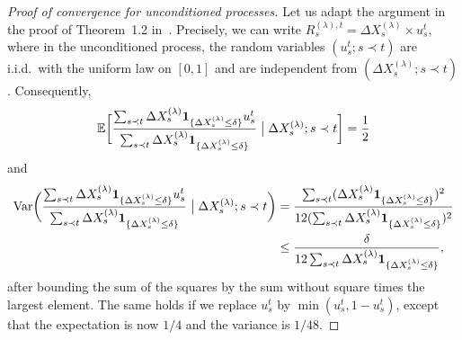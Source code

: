 \documentclass[british, a4paper,11pt]{article}
\numberwithin{equation}{section}
\theoremstyle{definition}
\newcommand{\E}{\mathop{}\!\mathbb{E}}
\newcommand{\Var}{\mathrm{Var}}
\newcommand{\ind}[1]{\mathbf{1}_{\{#1\}}}
\begin{document}
\begin{proof}[Proof of convergence for unconditioned processes]
Let us adapt the argument in the proof of Theorem~1.2 in~\cite{CK14}.
Precisely, we can write $R^{(\lambda),t}_s = \Delta X^{(\lambda)}_s \times u^t_s$, where 
in the unconditioned process, the random variables $(u^t_s ; s \prec t)$ are i.i.d.~with the uniform law on $[0,1]$ and are independent from $(\Delta X^{(\lambda)}_s ; s \prec t)$. Consequently,
\[\E\biggl[\frac{\sum_{s \prec t} \Delta X^{(\lambda)}_s \ind{\Delta X^{(\lambda)}_s \leq \delta} u^t_s}{\sum_{s \prec t} \Delta X^{(\lambda)}_s \ind{\Delta X^{(\lambda)}_s \leq \delta}} \bigm| \Delta X^{(\lambda)}_s ; s \prec t \biggr] = \frac{1}{2}\]
and
\begin{align*}
\Var\biggl(\frac{\sum_{s \prec t} \Delta X^{(\lambda)}_s \ind{\Delta X^{(\lambda)}_s \leq \delta} u^t_s}{\sum_{s \prec t} \Delta X^{(\lambda)}_s \ind{\Delta X^{(\lambda)}_s \leq \delta}}\bigm| \Delta X^{(\lambda)}_s ; s \prec t \biggr) 
&= \frac{\sum_{s \prec t} (\Delta X^{(\lambda)}_s \ind{\Delta X^{(\lambda)}_s \leq \delta})^2}{12 (\sum_{s \prec t} \Delta X^{(\lambda)}_s \ind{\Delta X^{(\lambda)}_s \leq \delta})^2}\\
&\leq \frac{\delta}{12 \sum_{s \prec t} \Delta X^{(\lambda)}_s \ind{\Delta X^{(\lambda)}_s \leq \delta}},
\end{align*}
after bounding the sum of the squares by the sum without square times the largest element.
The same holds if we replace $u^t_s$ by $\min(u^t_s, 1-u^t_s)$, except that the expectation is now $1/4$ and the variance is $1/48$.




\end{proof}
\end{document}
